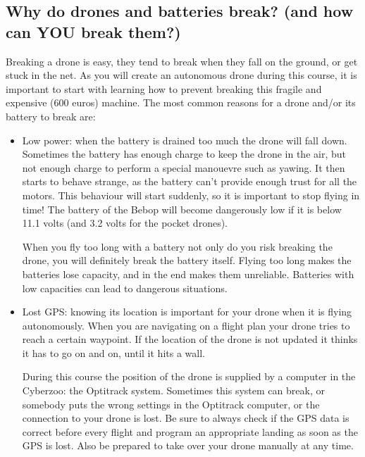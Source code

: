 \documentclass{article}
\begin{document}
\subsection*{Why do drones and batteries break? (and how can YOU break them?)}
Breaking a drone is easy, they tend to break when they fall on the ground, or get stuck in the net. As you will create an autonomous drone during this course, it is important to start with learning how to prevent breaking this fragile and expensive (600 euros) machine. The most common reasons for a drone and/or its battery to break are:
\begin{itemize}
\item Low power: when the battery is drained too much the drone will fall down. Sometimes the battery has enough charge to keep the drone in the air, but not enough charge to perform a special manouevre such as yawing. It then starts to behave strange, as the battery can't provide enough trust for all the motors. This behaviour will start suddenly, so it is important to stop flying in time! The battery of the Bebop will become dangerously low if it is below 11.1 volts (and 3.2 volts for the pocket drones).  

When you fly too long with a battery not only do you risk breaking the drone, you will definitely break the battery itself. Flying too long makes the batteries lose capacity, and in the end makes them unreliable. Batteries with low capacities can lead to dangerous situations. 
\item Lost GPS: knowing its location is important for your drone when it is flying autonomously. When you are navigating on a flight plan your drone tries to reach a certain waypoint. If the location of the drone is not updated it thinks it has to go on and on, until it hits a wall. 

During this course the position of the drone is supplied by a computer in the Cyberzoo: the Optitrack system. Sometimes this system can break, or somebody puts the wrong settings in the Optitrack computer, or the connection to your drone is lost. Be sure to always check if the GPS data is correct before every flight and program an appropriate landing as soon as the GPS is lost. Also be prepared to take over your drone manually at any time. 


\end{itemize}
\end{document}
